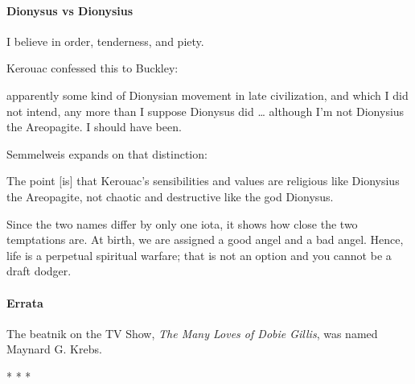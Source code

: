 \paragraph{Dionysus vs Dionysius}
\begin{quotex}
I believe in order, tenderness, and piety. 

\end{quotex}
Kerouac confessed this to Buckley:

\begin{quotex}
 apparently some kind of Dionysian movement in late civilization, and which I did not intend, any more than I suppose Dionysus did … although I'm not Dionysius the Areopagite. I should have been. 

\end{quotex}
Semmelweis expands on that distinction:

\begin{quotex}
The point [is] that Kerouac's sensibilities and values are religious like Dionysius the Areopagite, not chaotic and destructive like the god Dionysus. 

\end{quotex}
Since the two names differ by only one iota, it shows how close the two temptations are. At birth, we are assigned a good angel and a bad angel. Hence, life is a perpetual spiritual warfare; that is not an option and you cannot be a draft dodger.

\paragraph{Errata}
The beatnik on the TV Show, \emph{The Many Loves of Dobie Gillis}, was named Maynard G. Krebs.




\begin{center}* * *\end{center}

